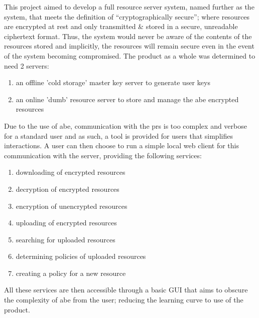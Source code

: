This project aimed to develop a full resource server system, named further as the \theResServer system, that meets the definition of ``cryptographically secure''; where resources are encrypted at rest and only transmitted \& stored in a secure, unreadable ciphertext format. Thus, the system would never be aware of the contents of the resources stored and implicitly, the resources will remain secure even in the event of the system becoming compromised. The product as a whole was determined to need 2 servers:
\begin{enumerate}
  \item an offline 'cold storage' master key server to generate user keys
  \item an online 'dumb' resource server to store and manage the \acrshort{abe} encrypted resources
\end{enumerate}
Due to the use of \acrshort{abe}, communication with the \acrfull{prs} is too complex and verbose for a standard user and as such, a tool is provided for users that simplifies interactions. A user can then choose to run a simple local web client for this communication with the server, providing the following services:
\begin{enumerate}
  \item downloading of encrypted resources
  \item decryption of encrypted resources
  \item encryption of unencrypted resources
  \item uploading of encrypted resources
  \item searching for uploaded resources
  \item determining policies of uploaded resources
  \item creating a policy for a new resource
\end{enumerate}
All these services are then accessible through a basic GUI that aims to obscure the complexity of \acrshort{abe} from the user; reducing the learning curve to use of the product.
